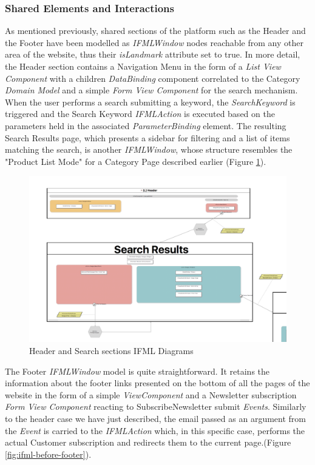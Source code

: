 \subsubsection{Shared Elements and Interactions}

As mentioned previously, shared sections of the platform such as the Header and the Footer have been modelled as \textit{IFMLWindow} nodes reachable from any other area of the website, thus their \textit{isLandmark} attribute set to true. In more detail, the Header section contains a Navigation Menu in the form of a \textit{List View Component} with a children \textit{DataBinding} component correlated to the Category \textit{Domain Model} and a simple \textit{Form View Component} for the search mechanism. When the user performs a search submitting a keyword, the \textit{SearchKeyword} is triggered and the Search Keyword \textit{IFMLAction} is executed based on the parameters held in the associated \textit{ParameterBinding} element.  The resulting Search Results page, which presents a sidebar for filtering and a list of items matching the search, is another \textit{IFMLWindow}, whose structure resembles the "Product List Mode" for a Category Page described earlier (Figure \ref{fig:ifml-before-header-search}).

\vspace{0.5cm}
\begin{figure}[H]
  \centering
    \includegraphics[width=12cm]{images/diagrams/before/ifml-header-search.png}
  \caption{Header and Search sections IFML Diagrams}
  \label{fig:ifml-before-header-search}
\end{figure}
\vspace{0.5cm}

The Footer \textit{IFMLWindow} model is quite straightforward. It retains the information about the footer links presented on the bottom of all the pages of the website in the form of a simple \textit{ViewComponent} and a Newsletter subscription \textit{Form View Component} reacting to SubscribeNewsletter submit \textit{Events}. Similarly to the header case we have just described, the email passed as an argument from the \textit{Event} is carried to the \textit{IFMLAction} which, in this specific case, performs the actual Customer subscription and redirects them to the current page.(Figure \ref{fig:ifml-before-footer}).

